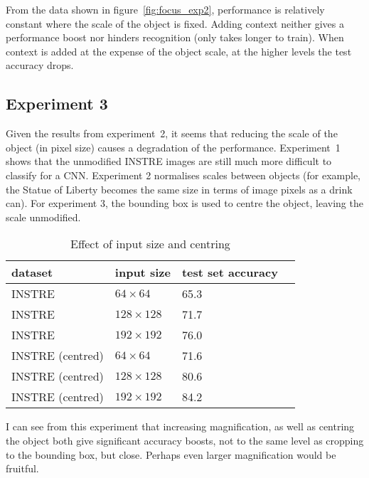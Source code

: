 From the data shown in figure~\ref{fig:focus_exp2}, performance is relatively constant where the scale of the object is fixed. Adding context neither gives a performance boost nor hinders recognition (only takes longer to train). When context is added at the expense of the object scale, at the higher levels the test accuracy drops.


\subsection {Experiment 3}

Given the results from experiment~2, it seems that reducing the scale of the object (in pixel size) causes a degradation of the performance. Experiment~1 shows that the unmodified INSTRE images are still much more difficult to classify for a CNN. Experiment 2 normalises scales between objects (for example, the Statue of Liberty becomes the same size in terms of image pixels as a drink can). For experiment 3, the bounding box is used to centre the object, leaving the scale unmodified.


\begin{table}[h]
  \centering
    \caption{Effect of input size and centring}
    
  \begin{tabular}{ l l l l }
    
    dataset & input size & test set accuracy \\
    \toprule
    
    INSTRE &  $ 64 \times 64 $ & 65.3 \\
    INSTRE &  $ 128 \times 128 $  & 71.7 \\
    INSTRE &  $ 192 \times 192 $  & 76.0 \\
    
    \toprule
    INSTRE (centred) &  $ 64 \times 64 $ & 71.6 \\
    INSTRE (centred) &  $ 128 \times 128 $  & 80.6 \\
    INSTRE (centred) &  $ 192 \times 192 $  & 84.2 \\
    
    
    
    \bottomrule
  \end{tabular}
\label{fig:focus_input_size}
\end{table}



I can see from this experiment that increasing magnification, as well as centring the object both give significant accuracy boosts, not to the same level as cropping to the bounding box, but close. Perhaps even larger magnification would be fruitful. 

